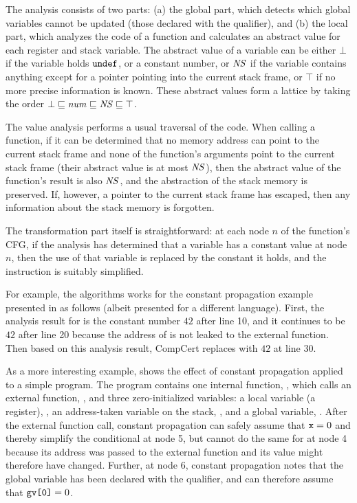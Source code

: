 The analysis consists of two parts: 
(a) the global part, which detects which global variables cannot be updated (\ie those declared with the  qualifier), and
(b) the local part, which analyzes the code of a function and calculates an abstract value for each register and stack variable.
The abstract value of a variable can be either $\bot$ if the variable holds $\tt undef$, 
or a constant number, 
or $\mathit{NS}$ if the variable contains anything except for a pointer pointing into the current stack frame, 
or $\top$ if no more precise information is known.
These abstract values form a lattice by taking the order $\bot \sqsubseteq \mathit{num} \sqsubseteq \mathit{NS} \sqsubseteq \top$.


The value analysis performs a usual traversal of the code. 
When calling a function, 
if it can be determined that no memory address can point to the current stack frame 
and none of the function's arguments point to the current stack frame (\ie their abstract value is at most $\mathit{NS}$), 
then the abstract value of the function's result is also $\mathit{NS}$, and the abstraction of the stack memory is preserved.
If, however, a pointer to the current stack frame has escaped, then any information about the stack memory is forgotten.

The transformation part itself is straightforward: 
at each node $n$ of the function's CFG, if the analysis has determined that a variable has a constant value at node $n$,
then the use of that variable is replaced by the constant it holds, and the instruction is suitably simplified.

For example, the algorithms works for the constant propagation example presented in
 as follows (albeit presented for a different language).  First, the
analysis result for  is the constant number $42$ after line 10, and it continues to be $42$
after line 20 because the address of  is not leaked to the external function.  Then based on
this analysis result, CompCert replaces  with $42$ at line 30.

As a more interesting example, 
 shows the effect of constant propagation applied to a simple program.
The program contains one internal function, , which calls an external function, ,
and three zero-initialized variables: 
a local variable (a register), , 
an address-taken variable on the stack, ,
and a global variable, .
After the external function call, 
constant propagation can safely assume that $\texttt{x}=0$ and thereby simplify the conditional at node 5,
but cannot do the same for  at node 4
because its address was passed to the external function and its value might therefore have changed.
Further, at node 6, 
constant propagation notes that the global variable  has been declared with the  qualifier,
and can therefore assume that $\texttt{gv[0]}=0$.


